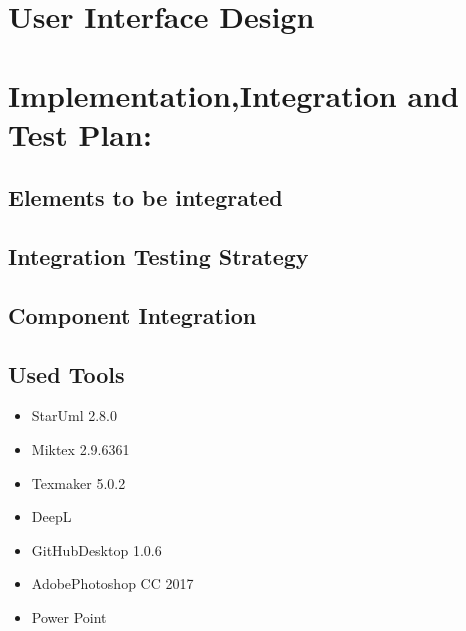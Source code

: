 \documentclass [12pt]{article}
\begin{document}
\section{User Interface Design}


\section{Implementation,Integration and Test Plan:}
\subsection{Elements to be integrated}

\subsection{Integration Testing Strategy}

\subsection{Component Integration}

\subsection{Used Tools}
\begin{itemize}
\item StarUml 2.8.0
\item Miktex 2.9.6361
\item Texmaker 5.0.2
\item DeepL
\item GitHubDesktop 1.0.6
\item AdobePhotoshop CC 2017
\item Power Point
\end{itemize}
\end{document}
